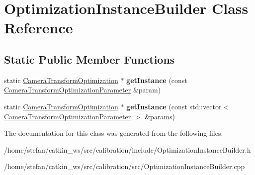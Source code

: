 \hypertarget{classOptimizationInstanceBuilder}{\section{\-Optimization\-Instance\-Builder \-Class \-Reference}
\label{classOptimizationInstanceBuilder}
}
\subsection*{\-Static \-Public \-Member \-Functions}
\begin{DoxyCompactItemize}
\item 
\hypertarget{classOptimizationInstanceBuilder_ab7768f462e7e3b67f32fdad8efbf17d7}{static \*
\hyperlink{classCameraTransformOptimization}{\-Camera\-Transform\-Optimization} $\ast$ {\bfseries get\-Instance} (const \hyperlink{classCameraTransformOptimizationParameter}{\-Camera\-Transform\-Optimization\-Parameter} \&param)}\label{classOptimizationInstanceBuilder_ab7768f462e7e3b67f32fdad8efbf17d7}

\item 
\hypertarget{classOptimizationInstanceBuilder_afb2f36a23c0360dbc1388441acbba2ac}{static \*
\hyperlink{classCameraTransformOptimization}{\-Camera\-Transform\-Optimization} $\ast$ {\bfseries get\-Instance} (const std\-::vector$<$ \hyperlink{classCameraTransformOptimizationParameter}{\-Camera\-Transform\-Optimization\-Parameter} $>$ \&params)}\label{classOptimizationInstanceBuilder_afb2f36a23c0360dbc1388441acbba2ac}

\end{DoxyCompactItemize}


\-The documentation for this class was generated from the following files\-:\begin{DoxyCompactItemize}
\item 
/home/stefan/catkin\-\_\-ws/src/calibration/include/\-Optimization\-Instance\-Builder.\-h\item 
/home/stefan/catkin\-\_\-ws/src/calibration/src/\-Optimization\-Instance\-Builder.\-cpp\end{DoxyCompactItemize}
